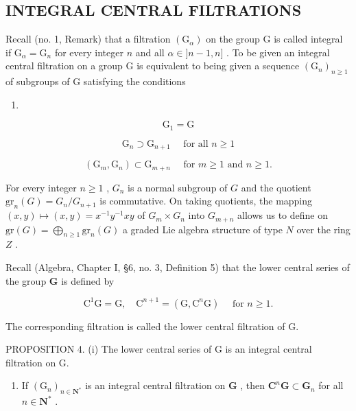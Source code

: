 \subsection{INTEGRAL CENTRAL FILTRATIONS}

Recall (no. 1, Remark) that a filtration \((\mathrm{G}_{\alpha})\) on the group G is called integral if \(\mathrm{G}_{\alpha} = \mathrm{G}_{n}\) for every integer \(n\) and all \(\alpha \in ]n - 1,n]\) . To be given an integral central filtration on a group G is equivalent to being given a sequence \((\mathrm{G}_n)_{n\geqslant 1}\) of subgroups of G satisfying the conditions

\begin{enumerate}
\def\labelenumi{(\roman{enumi})}
\tightlist
\item
\end{enumerate}

\[
\mathrm{G} _ {1} = \mathrm{G}\tag{i}
\]

\[
\mathrm{G} _ {n} \supset \mathrm{G} _ {n + 1} \quad \text { for   all } n \geqslant 1\tag{ii}
\]

\[
\left(\mathrm{G} _ {m}, \mathrm{G} _ {n}\right) \subset \mathrm{G} _ {m + n} \quad \text { for } m \geqslant 1 \text { and } n \geqslant 1.\tag{iii}
\]

For every integer \(n \geqslant 1\) , \(G_n\) is a normal subgroup of \(G\) and the quotient \(\mathrm{gr}_n(G) = G_n / G_{n+1}\) is commutative. On taking quotients, the mapping \((x,y) \mapsto (x,y) = x^{-1}y^{-1}xy\) of \(G_m \times G_n\) into \(G_{m+n}\) allows us to define on \(\mathrm{gr}(G) = \bigoplus_{n \geqslant 1} \mathrm{gr}_n(G)\) a graded Lie algebra structure of type \(N\) over the ring \(Z\) .

Recall (Algebra, Chapter I, §6, no. 3, Definition 5) that the lower central series of the group \(\mathbf{G}\) is defined by

\[
\mathrm{C} ^ {1} \mathrm{G} = \mathrm{G}, \quad \mathrm{C} ^ {n + 1} = (\mathrm{G}, \mathrm{C} ^ {n} \mathrm{G}) \quad \text { for } n \geqslant 1.\tag{28}
\]

The corresponding filtration is called the lower central filtration of G.

PROPOSITION 4. (i) The lower central series of G is an integral central filtration on G.

\begin{enumerate}
\def\labelenumi{(\roman{enumi})}
\setcounter{enumi}{1}
\tightlist
\item
  If \((\mathrm{G}_n)_{n\in \mathbf{N}^*}\) is an integral central filtration on \(\mathbf{G}\) , then \(\mathbf{C}^n\mathbf{G}\subset \mathbf{G}_n\) for all \(n\in \mathbf{N}^*\) .
\end{enumerate}

